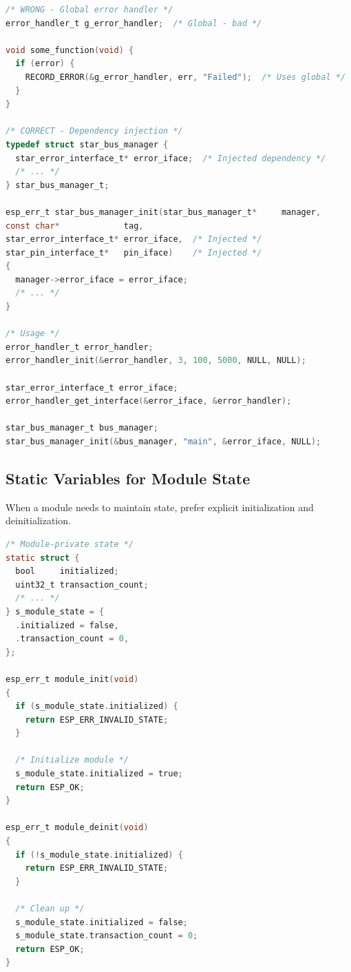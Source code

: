 \begin{lstlisting}[language=C]
/* WRONG - Global error handler */
error_handler_t g_error_handler;  /* Global - bad */

void some_function(void) {
  if (error) {
    RECORD_ERROR(&g_error_handler, err, "Failed");  /* Uses global */
  }
}

/* CORRECT - Dependency injection */
typedef struct star_bus_manager {
  star_error_interface_t* error_iface;  /* Injected dependency */
  /* ... */
} star_bus_manager_t;

esp_err_t star_bus_manager_init(star_bus_manager_t*     manager,
const char*             tag,
star_error_interface_t* error_iface,  /* Injected */
star_pin_interface_t*   pin_iface)    /* Injected */
{
  manager->error_iface = error_iface;
  /* ... */
}

/* Usage */
error_handler_t error_handler;
error_handler_init(&error_handler, 3, 100, 5000, NULL, NULL);

star_error_interface_t error_iface;
error_handler_get_interface(&error_iface, &error_handler);

star_bus_manager_t bus_manager;
star_bus_manager_init(&bus_manager, "main", &error_iface, NULL);
\end{lstlisting}

\subsection{Static Variables for Module State}

When a module needs to maintain state, prefer explicit initialization and deinitialization.

\begin{lstlisting}[language=C]
/* Module-private state */
static struct {
  bool     initialized;
  uint32_t transaction_count;
  /* ... */
} s_module_state = {
  .initialized = false,
  .transaction_count = 0,
};

esp_err_t module_init(void)
{
  if (s_module_state.initialized) {
    return ESP_ERR_INVALID_STATE;
  }
  
  /* Initialize module */
  s_module_state.initialized = true;
  return ESP_OK;
}

esp_err_t module_deinit(void)
{
  if (!s_module_state.initialized) {
    return ESP_ERR_INVALID_STATE;
  }
  
  /* Clean up */
  s_module_state.initialized = false;
  s_module_state.transaction_count = 0;
  return ESP_OK;
}
\end{lstlisting}

